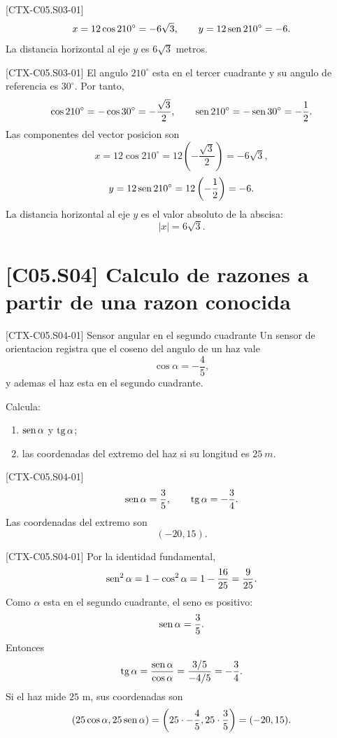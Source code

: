\begin{shortanswer}{[CTX-C05.S03-01]}
\[
x=12\cos 210^\circ=-6\sqrt{3},
\qquad
y=12\operatorname{sen} 210^\circ=-6.
\]
La distancia horizontal al eje \(y\) es \(6\sqrt{3}\) metros.
\end{shortanswer}

\begin{fullsolution}{[CTX-C05.S03-01]}
El angulo \(210^\circ\) esta en el tercer cuadrante y su angulo de referencia es \(30^\circ\).
Por tanto,
\[
\cos 210^\circ=-\cos 30^\circ=-\frac{\sqrt{3}}{2},
\qquad
\operatorname{sen} 210^\circ=-\operatorname{sen} 30^\circ=-\frac{1}{2}.
\]
Las componentes del vector posicion son
\[
x=12\cos 210^\circ=12\left(-\frac{\sqrt{3}}{2}\right)=-6\sqrt{3},
\]
\[
y=12\operatorname{sen} 210^\circ=12\left(-\frac{1}{2}\right)=-6.
\]
La distancia horizontal al eje \(y\) es el valor absoluto de la abscisa:
\[
|x|=6\sqrt{3}.
\]
\end{fullsolution}

\section{[C05.S04] Calculo de razones a partir de una razon conocida}

\begin{exercise}{[CTX-C05.S04-01] Sensor angular en el segundo cuadrante}
Un sensor de orientacion registra que el coseno del angulo de un haz vale
\[
\cos\alpha=-\frac{4}{5},
\]
y ademas el haz esta en el segundo cuadrante.

Calcula:
\begin{enumerate}
  \item \(\operatorname{sen}\alpha\) y \(\operatorname{tg}\alpha\);
  \item las coordenadas del extremo del haz si su longitud es \(\SI{25}{m}\).
\end{enumerate}
\end{exercise}

\begin{shortanswer}{[CTX-C05.S04-01]}
\[
\operatorname{sen}\alpha=\frac{3}{5},
\qquad
\operatorname{tg}\alpha=-\frac{3}{4}.
\]
Las coordenadas del extremo son
\[
(-20,15).
\]
\end{shortanswer}

\begin{fullsolution}{[CTX-C05.S04-01]}
Por la identidad fundamental,
\[
\operatorname{sen}^2\alpha=1-\cos^2\alpha=1-\frac{16}{25}=\frac{9}{25}.
\]
Como \(\alpha\) esta en el segundo cuadrante, el seno es positivo:
\[
\operatorname{sen}\alpha=\frac{3}{5}.
\]
Entonces
\[
\operatorname{tg}\alpha=\frac{\operatorname{sen}\alpha}{\cos\alpha}=
\frac{3/5}{-4/5}=-\frac{3}{4}.
\]
Si el haz mide \(25\) m, sus coordenadas son
\[
(25\cos\alpha,25\operatorname{sen}\alpha)=\left(25\cdot -\frac45,25\cdot \frac35\right)=(-20,15).
\]
\end{fullsolution}

